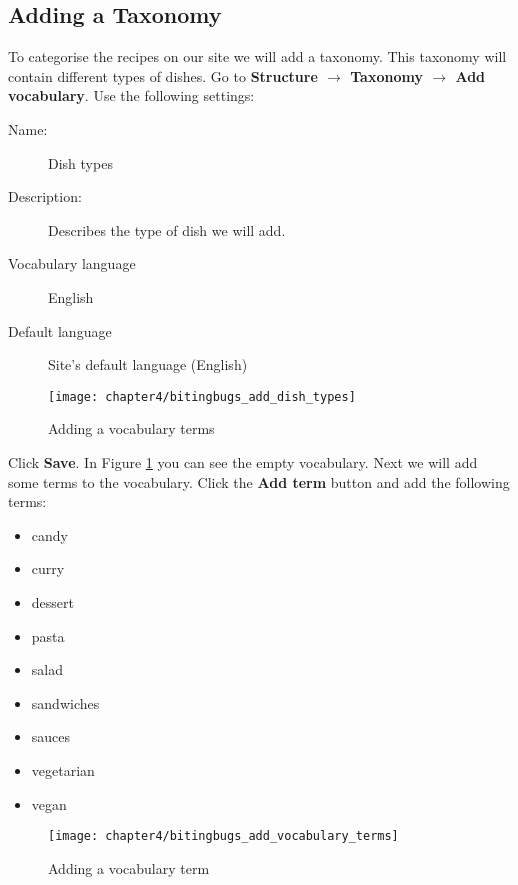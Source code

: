   \subsection{Adding a Taxonomy}
  
  To categorise the recipes on our site we will add a taxonomy. This taxonomy will contain different types of dishes. Go to \textbf{Structure $\rightarrow$ Taxonomy $\rightarrow$ Add vocabulary}. Use the following settings: 
  
  \begin{description}
  	\item[Name:] Dish types
  	\item[Description:] Describes the type of dish we will add.
  	\item[Vocabulary language] English
  	\item[Default language] Site's default language (English)
  \end{description}
  
  \begin{figure}[H]
  	\centering
  	\texttt{[image: chapter4/bitingbugs\_add\_dish\_types]}
  	\caption{Adding a vocabulary terms}
  	\label{fig:bitingbugs_add_dish_types}
  \end{figure}
  
  Click \textbf{Save}. In Figure \ref{fig:bitingbugs_add_dish_types} you can see the empty vocabulary. Next we will add some terms to the vocabulary. Click the \textbf{Add term} button and add the following terms:
  
  \begin{itemize}
  	\item candy
  	\item curry
  	\item dessert
  	\item pasta
  	\item salad
  	\item sandwiches 
  	\item sauces
  	\item vegetarian
  	\item vegan
  \end{itemize}
  
  
    \begin{figure}[H]
    	\centering
    	\texttt{[image: chapter4/bitingbugs\_add\_vocabulary\_terms]}
    	\caption{Adding a vocabulary term}
    	\label{fig:bitingbugs_add_vocabulary_terms}
    \end{figure}
    
